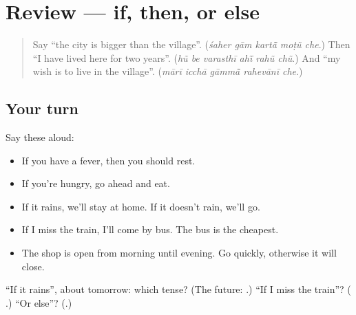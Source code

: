 \section[(review)]{Review — if, then, or else}

\label{lesson:GU-R283-if-and-otherwise}



\begin{quote}
Say \textquotedblleft{}the city is bigger than the village\textquotedblright{}. (\emph{śaher gām kartā̃ moṭũ che}.) Then \textquotedblleft{}I have lived here for two years\textquotedblright{}. (\emph{hũ be varasthī ahī̃ rahũ chũ}.) And \textquotedblleft{}my wish is to live in the village\textquotedblright{}. (\emph{mārī icchā gāmmā̃ rahevānī che}.)
\end{quote}

\subsection*{Your turn}
Say these aloud:

\begin{itemize}
\raggedright
  \item If you have a fever, then you should rest.
  \item If you're hungry, go ahead and eat.
  \item If it rains, we'll stay at home. If it doesn't rain, we'll go.
  \item If I miss the train, I'll come by bus. The bus is the cheapest.
  \item The shop is open from morning until evening. Go quickly, otherwise it will close.
\end{itemize}

\begin{tcolorbox}[breakable,colback=teal!4,colframe=teal!35!black,title={Before you move on}]
\textquotedblleft{}If it rains\textquotedblright{}, about tomorrow: which tense? (The future: \textbf{}.) \textquotedblleft{}If I miss the train\textquotedblright{}? (\textbf{   }.) \textquotedblleft{}Or else\textquotedblright{}? (\textbf{}.)
\end{tcolorbox}
